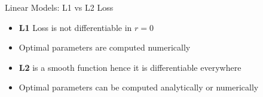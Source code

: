 \documentclass[11pt,compress,t,notes=noshow, xcolor=table]{beamer}
\begin{document}
\begin{vbframe}{Linear Models: L1 vs L2 Loss}

\begin{minipage}[t]{0.45\textwidth}
    \footnotesize
    \begin{itemize}
        \item \small \textbf{L1} Loss is not differentiable in \textbf{$r = 0$}
        \item \small Optimal parameters are computed numerically 

    \end{itemize}
\end{minipage}
\hfill
\begin{minipage}[t]{0.45\textwidth}
    \footnotesize
    \begin{itemize}
        \item \small \textbf{L2} is a smooth function hence it is differentiable everywhere 
        \item \small Optimal parameters can be computed analytically or numerically 
    \end{itemize}
\end{minipage}

\end{vbframe}
\end{document}
